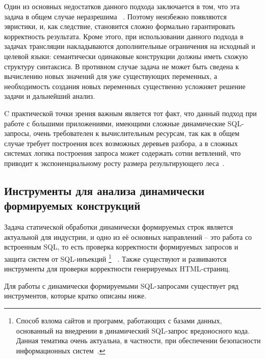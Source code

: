 \documentclass{llncs}
\begin{document}
Один из основных недостатков данного подхода заключается в том, что эта задача в общем случае неразрешима ~\cite{ALVOR2}. Поэтому неизбежно появляются эвристики, и, как следствие, становится сложно формально гарантировать корректность результата. Кроме этого, при использовании данного подхода в задачах  трансляции накладываются дополнительные ограничения на исходный и целевой языки: семантически одинаковые конструкции должны иметь схожую структуру синтаксиса. В противном случае задача не может быть сведена к вычислению новых значений для уже существующих переменных, а необходимость создания новых переменных существенно усложняет решение задачи и дальнейший анализ.

C практической точки зрения важным является тот факт, что данный подход при работе с  большими приложениями, имеющими  сложные динамические SQL-запросы, очень требователен к вычислительным ресурсам, так как в общем случае требует построения всех возможных деревьев разбора, а в сложных системах логика построения запроса может содержать сотни ветвлений, что приводит к экспоненциальному росту размера результирующего леса~\cite{TiunovaUIInt}. 

\subsection{ Инструменты для анализа динамически формируемых конструкций}

Задача статической обработки динамически формируемых строк является актуальной для индустрии, и одно из её основных направлений  -- это работа со встроенным SQL, то есть проверка корректности формируемых запросов и защита систем от SQL-инъекций \footnote{Способ взлома сайтов и программ, работающих с базами данных, основанный на  внедрении в динамический SQL-запрос вредоносного кода. Данная тематика очень актуальна, в частности, при обеспечении безопасности информационных систем~\cite{SAForInject}.} ~\cite{SAForInject}. Также существуют и развиваются инструменты для проверки корректности генерируемых HTML-страниц.

Для работы с динамически формируемыми SQL-запросами существует ряд инструментов, которые кратко описаны ниже.
\end{document}
